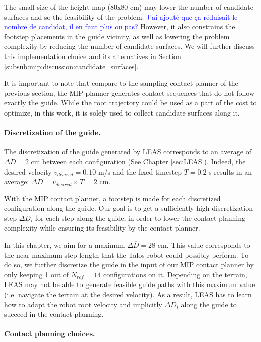 The small size of the height map (80x80 cm) may lower the number of candidate surfaces and so the feasibility of the problem. 
 \textcolor{blue}{J'ai ajouté que ça réduisait le nombre de candidat, il en faut plus ou pas?}
However, it also constrains the footstep placements in the guide vicinity, as well as lowering the problem complexity by reducing the number of candidate surfaces.
We will further discuss this implementation choice and its alternatives in Section \ref{subsub:mip:discussion:candidate_surfaces}.

It is important to note that compare to the sampling contact planner of the previous section, the MIP planner generates contact sequences that do not follow exactly the guide.
While the root trajectory could be used as a part of the cost to optimize, in this work, it is solely used to collect candidate surfaces along it.


\paragraph{Discretization of the guide.}
The discretization of the guide generated by LEAS corresponds to an average of $\Delta \overline{D}=2$ cm between each configuration (See Chapter \ref{sec:LEAS}). Indeed, the desired velocity $v_{desired}=0.10$ m/s and the fixed timestep $T=0.2$ s results in an average: $\Delta \overline{D} = v_{desired} \times T = 2$ cm.

With the MIP contact planner, a footstep is made for each discretized configuration along the guide.
Our goal is to get a sufficiently high discretization step $\Delta D_i$ for each step along the guide, in order to lower the contact planning complexity while ensuring its feasibility by the contact planner.

In this chapter, we aim for a maximum $\Delta \overline{D} =28$ cm. 
This value corresponds to the near maximum step length that the Talos robot could possibly perform.
To do so, we further discretize the guide in the input of our MIP contact planner by only keeping 1 out of $N_{ref}=14$ configurations on it.
Depending on the terrain, LEAS may not be able to generate feasible guide paths with this maximum value (i.e. navigate the terrain at the desired velocity).
As a result, LEAS has to learn how to adapt the robot root velocity and implicitly $\Delta D_i$ along the guide to succeed in the contact planning.


\paragraph{Contact planning choices.}

